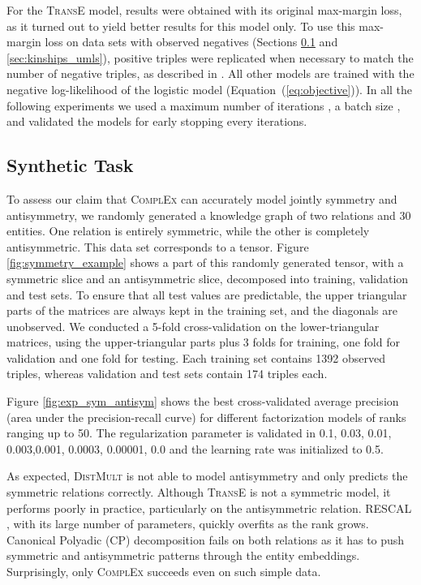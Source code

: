 \documentclass[twoside,11pt]{article}
\renewcommand{\cite}{\citep}
\begin{document}
For the \textsc{TransE} model, results were obtained with its 
original max-margin loss, as
it turned out to yield better results for this model only. 
To use this max-margin loss on data sets with observed
negatives (Sections \ref{sec:synth_task} and \ref{sec:kinships_umls}), positive
triples were replicated when necessary to match the number of negative triples, 
as described in \citet{garcia2016combining}.
All other models are trained with the negative log-likelihood of the logistic model (Equation~(\ref{eq:objective})). In all the following experiments we used a maximum number of iterations ,
a batch size , and validated the models for early stopping 
every  iterations.

\subsection{Synthetic Task}
\label{sec:synth_task}

To assess our claim that \textsc{ComplEx} can accurately model jointly symmetry and antisymmetry, we randomly generated a knowledge graph of two relations and 30 entities. One relation is entirely symmetric, while the other is completely antisymmetric. This data set corresponds to a  tensor. Figure \ref{fig:symmetry_example} shows a part of this randomly generated tensor, with a symmetric slice and an antisymmetric slice, decomposed into training, validation and test sets. To ensure that all test values are predictable, the upper triangular parts of the matrices are always kept in the training set, and the diagonals are unobserved. We conducted a 5-fold cross-validation on the lower-triangular matrices, using the upper-triangular parts plus 3 folds for training, one fold for validation and one fold for testing. Each training set contains 1392 observed triples, whereas validation and test sets contain 174 triples each. 

Figure \ref{fig:exp_sym_antisym} shows the best cross-validated average precision (area under the precision-recall curve) for different factorization models of ranks ranging up to 50. The regularization parameter  is validated in 0.1, 0.03, 0.01, 0.003,0.001, 0.0003, 0.00001, 0.0 and the learning rate  was initialized to 0.5.


As expected, \textsc{DistMult} \cite{Yang2015} is not able to model antisymmetry and only predicts the symmetric relations correctly. Although \textsc{TransE} \cite{bordes2013translating} is not a symmetric model, it performs poorly in practice, particularly on the antisymmetric relation. 
RESCAL \cite{Nickel2011}, with its large number of parameters, quickly overfits as the rank grows. Canonical Polyadic (CP) decomposition \cite{hitchcock-sum-1927} fails on both relations as it has to push symmetric and antisymmetric patterns through the entity embeddings. Surprisingly, only \textsc{ComplEx} succeeds even on such simple data.
\end{document}
